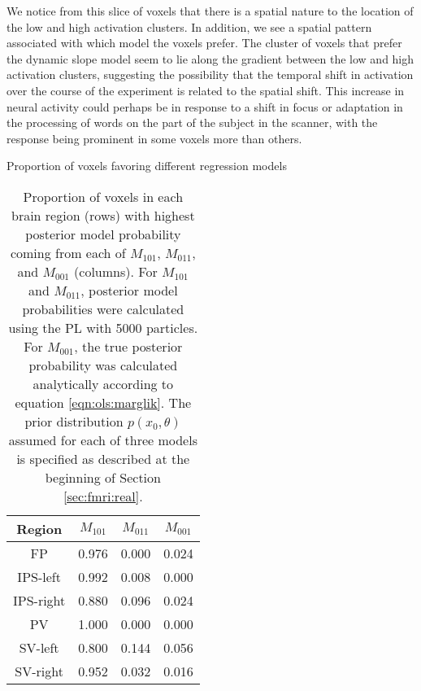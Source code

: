 We notice from this slice of voxels that there is a spatial nature to the location of the low and high activation clusters. In addition, we see a spatial pattern associated with which model the voxels prefer. The cluster of voxels that prefer the dynamic slope model seem to lie along the gradient between the low and high activation clusters, suggesting the possibility that the temporal shift in activation over the course of the experiment is related to the spatial shift. This increase in neural activity could perhaps be in response to a shift in focus or adaptation in the processing of words on the part of the subject in the scanner, with the response being prominent in some voxels more than others.


\begin{table}
\ssp
\centering
\caption{Proportion of voxels favoring different regression models} \label{tab:fmri:favor}
\begin{tabular}{|c|ccc|}
\hline
Region & $M_{101}$ & $M_{011}$ & $M_{001}$ \\
\hline
FP & 0.976 & 0.000 & 0.024 \\
IPS-left & 0.992 & 0.008 & 0.000 \\
IPS-right & 0.880 & 0.096 & 0.024 \\
PV & 1.000 & 0.000 & 0.000 \\
SV-left & 0.800 & 0.144 & 0.056 \\
SV-right & 0.952 & 0.032 & 0.016 \\
\hline
\end{tabular}
\caption*{Proportion of voxels in each brain region (rows) with highest posterior model probability coming from each of $M_{101}$, $M_{011}$, and $M_{001}$ (columns). For $M_{101}$ and $M_{011}$, posterior model probabilities were calculated using the PL with 5000 particles. For $M_{001}$, the true posterior probability was calculated analytically according to equation \eqref{eqn:ols:marglik}. The prior distribution $p(x_0,\theta)$ assumed for each of three models is specified as described at the beginning of Section \ref{sec:fmri:real}.}
\end{table}

